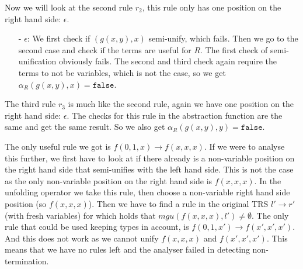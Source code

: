 Now we will look at the second rule $r_2$, this rule only has one position on the right hand side: $\epsilon$.
\begin{itemize}
    \itemsep 0em
    \item[-] $\epsilon$: We first check if $(g(x, y), x)$ semi-unify, which fails. Then we go to the second case and check if the terms are useful for $R$. The first check of semi-unification obviously fails. The second and third check again require the terms to not be variables, which is not the case, so we get $\alpha_R(g(x,y), x) = \texttt{false}$.
\end{itemize}
The third rule $r_3$ is much like the second rule, again we have one position on the right hand side: $\epsilon$. The checks for this rule in the abstraction function are the same and get the same result. So we also get $\alpha_R(g(x,y), y) = \texttt{false}$.

\noindent The only useful rule we got is $f(0, 1, x) \rightarrow f(x,x,x)$. If we were to analyse this further, we first have to look at if there already is a non-variable position on the right hand side that semi-unifies with the left hand side. This is not the case as the only non-variable position on the right hand side is $f(x, x, x)$. In the unfolding operator we take this rule, then choose a non-variable right hand side position (so $f(x,x,x)$). Then we have to find a rule in the original TRS $l' \rightarrow r'$ (with fresh variables) for which holds that $\textit{mgu}(f(x,x,x), l') \neq \emptyset$. The only rule that could be used keeping types in account, is $f(0, 1, x') \rightarrow f(x', x', x')$. And this does not work as we cannot unify $f(x,x,x)$ and $f(x', x', x')$. This means that we have no rules left and the analyser failed in detecting non-termination. 